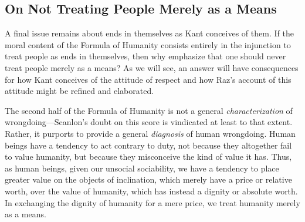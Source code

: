 \documentclass[a4paper,12pt]{article}
\begin{document}

\subsection{On Not Treating People Merely as a Means} \label{sub:on_not_treating_people_merely_as_a_means} %

A final issue remains about ends in themselves as Kant conceives of them. If the moral content of the Formula of Humanity consists entirely in the injunction to treat people as ends in themselves, then why emphasize that one should never treat people merely as a means? As we will see, an answer will have consequences for how Kant conceives of the attitude of respect and how Raz's account of this attitude might be refined and elaborated.

The second half of the Formula of Humanity is not a general \emph{characterization} of wrongdoing---Scanlon's doubt on this score is vindicated at least to that extent. Rather, it purports to provide a general \emph{diagnosis} of human wrongdoing. Human beings have a tendency to act contrary to duty, not because they altogether fail to value humanity, but because they misconceive the kind of value it has. Thus, as human beings, given our unsocial sociability, we have a tendency to place greater value on the objects of inclination, which merely have a price or relative worth, over the value of humanity, which has instead a dignity or absolute worth. In exchanging the dignity of humanity for a mere price, we treat humanity merely as a means.
\end{document}
